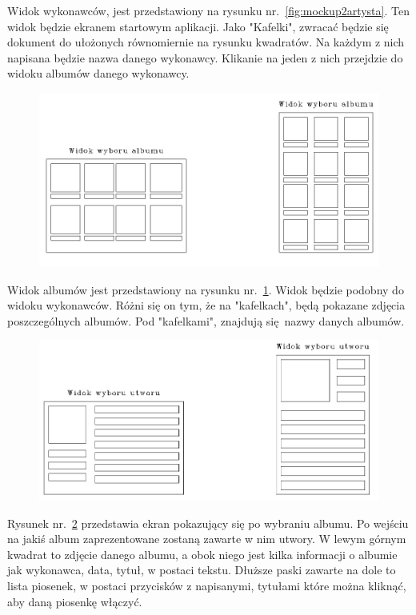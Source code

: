Widok wykonawców, jest przedstawiony na rysunku nr.~\ref{fig:mockup2artysta}. Ten widok będzie ekranem startowym aplikacji. Jako "Kafelki", zwracać będzie się dokument do ułożonych równomiernie na rysunku kwadratów. Na każdym z nich napisana będzie nazwa danego wykonawcy. Klikanie na jeden z nich przejdzie do widoku albumów danego wykonawcy.

\begin{figure}[H]
	\centering
	\includegraphics[width=1\linewidth]{images/mockup2_albumy}
	\caption{}
	\label{fig:mockup2albumy}
\end{figure}

Widok albumów jest przedstawiony na rysunku nr.~\ref{fig:mockup2albumy}. Widok będzie podobny do widoku wykonawców. Różni się on tym, że na "kafelkach", będą pokazane zdjęcia poszczególnych albumów. Pod "kafelkami", znajdują się nazwy danych albumów.

\begin{figure}[H]
	\centering
	\includegraphics[width=1\linewidth]{images/mockup2_utwory}
	\caption{}
	\label{fig:mockup2utwory}
\end{figure}


Rysunek nr.~\ref{fig:mockup2utwory} przedstawia ekran pokazujący się po wybraniu albumu. Po wejściu na jakiś album zaprezentowane zostaną zawarte w nim utwory. W lewym górnym kwadrat to zdjęcie danego albumu, a obok niego jest kilka informacji o albumie jak wykonawca, data, tytuł, w postaci tekstu. Dłuższe paski zawarte na dole to lista piosenek, w postaci przycisków z napisanymi, tytułami które można kliknąć, aby daną piosenkę włączyć.

